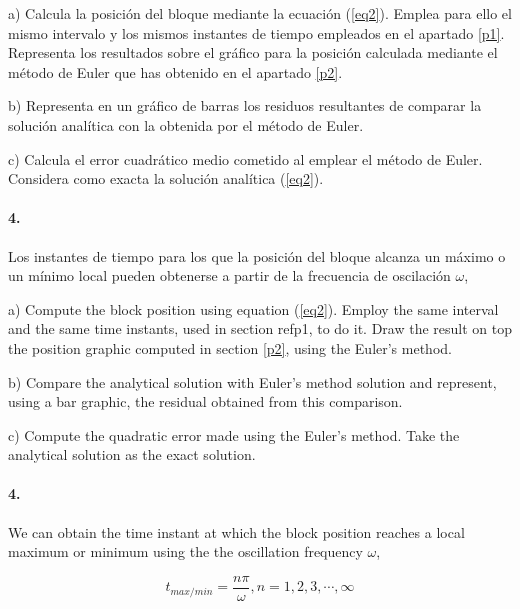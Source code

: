 \begin{paracol}{2}
a) Calcula la posición del bloque mediante la ecuación (\ref{eq2}). Emplea para ello el mismo intervalo y los mismos instantes de tiempo empleados en el apartado \ref{p1}. Representa los resultados sobre el gráfico  para la posición calculada mediante el método de Euler que has obtenido en el apartado \ref{p2}. 

b) Representa en un gráfico de barras los residuos resultantes de comparar la solución analítica con la obtenida por el método de Euler.

c) Calcula el error cuadrático medio cometido al emplear el método de Euler. Considera como exacta la solución analítica (\ref{eq2}).


\paragraph{4.} Los instantes de tiempo para los que la posición del bloque alcanza un máximo o un mínimo local pueden obtenerse a partir de la frecuencia de oscilación $\omega$,

\switchcolumn
a) Compute the block position using equation (\ref{eq2}). Employ the same interval and the same time instants, used in section ref{p1}, to do it. Draw the result on top the position graphic computed in section \ref{p2}, using the Euler's method.

b) Compare the analytical solution with Euler's method solution and represent, using a bar graphic, the residual obtained from this comparison.

c) Compute the quadratic error made using the Euler's method. Take the analytical solution as the exact solution.  

\paragraph{4.} We can obtain the time instant at which the block position reaches a local maximum or minimum using the the oscillation frequency $\omega$,
\end{paracol}
\begin{equation}\label{eq4}
t_{max/min} = \frac{n \pi}{\omega}, n = 1,2,3,\cdots, \infty
\end{equation}

